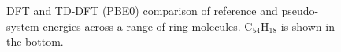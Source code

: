 \documentclass[12pt]{article}
\begin{document}
\begin{figure}
\begin{center}
\end{center}
\vspace{0.25in}
\hspace*{3in}

\caption{DFT and TD-DFT (PBE0) comparison of reference and pseudo-system energies across a range of ring molecules. 
C\(_{54}\)H\(_{18}\) is shown in the bottom.}
\label{fig:rings_graphs}
\end{figure}
\end{document}
